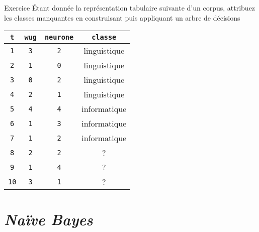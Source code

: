 \documentclass[../allslides.tex]{subfiles}
\begin{document}
\renewcommand\docdate{2021-02-18}  %



\begin{frame}[fragile=singleslide]{Exercice}
	Étant donnée la représentation tabulaire suivante d'un corpus, attribuez les classes manquantes en construisant puis appliquant un arbre de décisions
	\begin{table}
		\begin{tabu} to .9
			\texttt{t}  & \texttt{wug} & \texttt{neurone} & \texttt{classe}\\
			\hline
			\texttt{1}  & \texttt{3}      & \texttt{2}	& linguistique\\
			\texttt{2}  & \texttt{1}      & \texttt{0}	& linguistique\\
			\texttt{3}  & \texttt{0}      & \texttt{2}	& linguistique\\
			\texttt{4}  & \texttt{2}      & \texttt{1}	& linguistique\\
			\texttt{5}  & \texttt{4}      & \texttt{4}	& informatique\\
			\texttt{6}  & \texttt{1}      & \texttt{3}	& informatique\\
			\texttt{7}  & \texttt{1}      & \texttt{2}	& informatique\\
			\texttt{8}  & \texttt{2}      & \texttt{2}	& ?\\
			\texttt{9}  & \texttt{1}      & \texttt{4}	& ?\\
			\texttt{10}  & \texttt{3}      & \texttt{1}	& ?\\
		\end{tabu}
	\end{table}
\end{frame}

%

\section{\emph{Naïve Bayes}}
\end{document}
